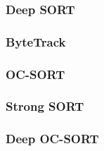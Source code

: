 

\needspace{0.3\textheight}
\subsubsection{Deep SORT}



\needspace{0.18\textheight}
\subsubsection{ByteTrack}\label{sec:BYTE}



\subsubsection{OC-SORT}



\subsubsection{Strong SORT}



\subsubsection{Deep OC-SORT}


